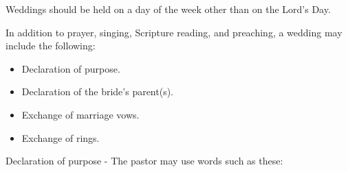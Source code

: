 \begin{outerlst}[left=0pt,labelsep=0pt]
\begin{innerlst}[resume*]
      \item Weddings should be held on a day of the week other than on the Lord's Day.  
      \item In addition to prayer, singing, Scripture reading, and preaching, a wedding may include the following:  
      \begin{itemize}[noitemsep]
            \item Declaration of purpose. 
            \item Declaration of the bride's parent(s). 
            \item Exchange of marriage vows. 
            \item Exchange of rings. 
      \end{itemize} 
      \item Declaration of purpose - The pastor may use words such as these: 
\end{innerlst}

\end{outerlst}
